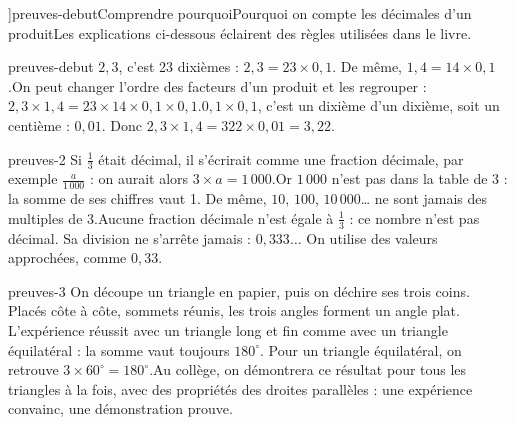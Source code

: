 \editionPage[\pdfbookmark[0]{Comprendre pourquoi}{bm-preuves-debut-parent}]{preuves-debut}{Comprendre pourquoi}{Pourquoi on compte les décimales d’un produit}{Les explications ci-dessous éclairent des règles utilisées dans le livre.}
\begin{blocEdition}{preuves-debut}
$2{,}3$, c’est 23 dixièmes : $2{,}3=23\times0{,}1$. De même, $1{,}4=14\times0{,}1$.On peut changer l’ordre des facteurs d’un produit et les regrouper : $2{,}3\times1{,}4=23\times14\times0{,}1\times0{,}1$.$0{,}1\times0{,}1$, c’est un dixième d’un dixième, soit un centième : $0{,}01$. Donc $2{,}3\times1{,}4=322\times0{,}01=3{,}22$.\label{fig-preuves-debut-preuve-produit}
\end{blocEdition}
\begin{blocEdition}{preuves-2}
Si $\frac13$ était décimal, il s’écrirait comme une fraction décimale, par exemple $\frac{a}{1\,000}$ : on aurait alors $3\times a=1\,000$.Or $1\,000$ n’est pas dans la table de 3 : la somme de ses chiffres vaut 1. De même, $10$, $100$, $10\,000$… ne sont jamais des multiples de 3.Aucune fraction décimale n’est égale à $\frac13$ : ce nombre n’est pas décimal. Sa division ne s’arrête jamais : $0{,}333\ldots$ On utilise des valeurs approchées, comme $0{,}33$.
\end{blocEdition}
\begin{blocEdition}{preuves-3}
On découpe un triangle en papier, puis on déchire ses trois coins. Placés côte à côte, sommets réunis, les trois angles forment un angle plat.\label{fig-preuves-3-preuve-triangle}
L’expérience réussit avec un triangle long et fin comme avec un triangle équilatéral : la somme vaut toujours $180^\circ$. Pour un triangle équilatéral, on retrouve $3\times60^\circ=180^\circ$.Au collège, on démontrera ce résultat pour tous les triangles à la fois, avec des propriétés des droites parallèles : une expérience convainc, une démonstration prouve.
\end{blocEdition}
